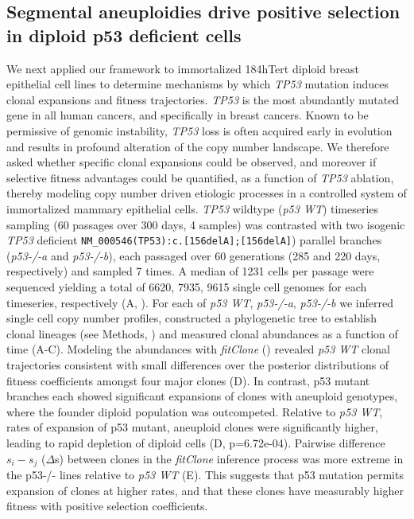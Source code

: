 \subsection*{Segmental aneuploidies drive positive selection in diploid p53 deficient cells}
We next applied our framework to immortalized 184hTert diploid breast epithelial cell lines\cite{Burleigh2015-fk} to determine mechanisms by which \textit{TP53} mutation induces clonal expansions and fitness trajectories. \textit{TP53} is the most abundantly mutated gene in all human cancers\cite{Vega2018-hs}, and specifically in breast cancers\cite{Cancer_Genome_Atlas_Network2012-ug,Shah2012-vx}.  Known to be permissive of genomic instability, \textit{TP53} loss is often acquired early in evolution and results in profound alteration of the copy number landscape\cite{Patch2015-xq,Li2020-cn,Nik-Zainal2016-tu,McPherson2016-nv}. We therefore asked whether specific clonal expansions could be observed, and moreover if selective fitness advantages could be quantified, as a function of \textit{TP53} ablation, thereby modeling copy number driven etiologic processes in a controlled system of immortalized mammary epithelial cells. \textit{TP53} wildtype (\textit{p53 WT}) timeseries sampling (60 passages over 300 days, 4 samples) was contrasted with two isogenic \textit{TP53} deficient \verb|NM_000546(TP53):c.[156delA];[156delA]|\cite{Laks2019-dm})
parallel branches (\textit{p53-/-a} and \textit{p53-/-b}), each passaged over 60 generations (285 and 220 days, respectively) and sampled 7 times. A median of 1231 cells per passage were sequenced yielding a total of 6620, 7935, 9615 single cell genomes for each timeseries, respectively (A, ). For each of \textit{p53 WT}, \textit{p53-/-a}, \textit{p53-/-b} we inferred single cell copy number profiles, constructed a phylogenetic tree to establish clonal lineages (see Methods, ) and measured clonal abundances as a function of time (A-C). 
Modeling the abundances with \textit{fitClone} () revealed \textit{p53 WT} clonal trajectories consistent with small differences over the posterior distributions of fitness coefficients amongst four major clones (D). In contrast, p53 mutant branches each showed significant expansions of clones with aneuploid genotypes, where the founder diploid population was outcompeted. Relative to \textit{p53 WT}, rates of expansion of p53 mutant, aneuploid clones were significantly higher, leading to rapid depletion of diploid cells (D, p=6.72e-04). Pairwise difference $s_i-s_j$ ($\Delta$s) between clones in the \textit{fitClone} inference process was more extreme in the p53-/- lines relative to \textit{p53 WT} (E). This suggests that p53 mutation permits expansion of clones at higher rates, and that these clones have measurably higher fitness with positive selection coefficients.

